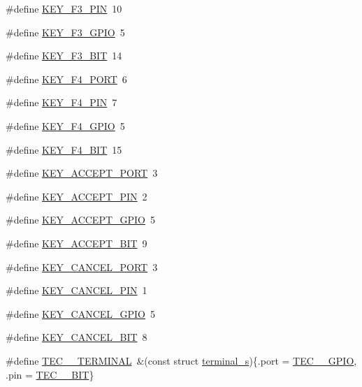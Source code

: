 \begin{DoxyCompactItemize}
\#define \hyperlink{group__hal_ga98312a957dc7b3acccc0fe34a7604e56}{K\+E\+Y\+\_\+\+F3\+\_\+\+P\+IN}~10
\item 
\#define \hyperlink{group__hal_gac7de7a3e791e70cb61e1ba74c23fd8f3}{K\+E\+Y\+\_\+\+F3\+\_\+\+G\+P\+IO}~5
\item 
\#define \hyperlink{group__hal_ga0b750ff71397168903bb9406b4a0bc43}{K\+E\+Y\+\_\+\+F3\+\_\+\+B\+IT}~14
\item 
\#define \hyperlink{group__hal_gaeb2af3258e8481b8855ee6df928fdae4}{K\+E\+Y\+\_\+\+F4\+\_\+\+P\+O\+RT}~6
\item 
\#define \hyperlink{group__hal_ga0b7c8de71cb61c639769e5b3b8ba9603}{K\+E\+Y\+\_\+\+F4\+\_\+\+P\+IN}~7
\item 
\#define \hyperlink{group__hal_gabc1b6065dd7a4f9e7c7eb492f7d3d548}{K\+E\+Y\+\_\+\+F4\+\_\+\+G\+P\+IO}~5
\item 
\#define \hyperlink{group__hal_gadd1233da3fb79555176e60c1433f5d2c}{K\+E\+Y\+\_\+\+F4\+\_\+\+B\+IT}~15
\item 
\#define \hyperlink{group__hal_gac8f017f65635f88ecc35b36bfe9350cb}{K\+E\+Y\+\_\+\+A\+C\+C\+E\+P\+T\+\_\+\+P\+O\+RT}~3
\item 
\#define \hyperlink{group__hal_gaacdece44fd577054dbd03456a76005db}{K\+E\+Y\+\_\+\+A\+C\+C\+E\+P\+T\+\_\+\+P\+IN}~2
\item 
\#define \hyperlink{group__hal_gaec67cfa1c357906d3146de59945a5af1}{K\+E\+Y\+\_\+\+A\+C\+C\+E\+P\+T\+\_\+\+G\+P\+IO}~5
\item 
\#define \hyperlink{group__hal_ga099967afffab053d7b61dc41f1806b8d}{K\+E\+Y\+\_\+\+A\+C\+C\+E\+P\+T\+\_\+\+B\+IT}~9
\item 
\#define \hyperlink{group__hal_ga1bd0a92ccf5d51cbf7510082eff13a95}{K\+E\+Y\+\_\+\+C\+A\+N\+C\+E\+L\+\_\+\+P\+O\+RT}~3
\item 
\#define \hyperlink{group__hal_ga42a5a9380916b6a8f9a1601e4d16e3ce}{K\+E\+Y\+\_\+\+C\+A\+N\+C\+E\+L\+\_\+\+P\+IN}~1
\item 
\#define \hyperlink{group__hal_ga072fd7b6b6eb89b2e4a61425d8b81b09}{K\+E\+Y\+\_\+\+C\+A\+N\+C\+E\+L\+\_\+\+G\+P\+IO}~5
\item 
\#define \hyperlink{group__hal_ga26ec6a583f60654278e37c9d911d791b}{K\+E\+Y\+\_\+\+C\+A\+N\+C\+E\+L\+\_\+\+B\+IT}~8
\item 
\#define \hyperlink{group__hal_gaff1d0922fe20ad714250846eee12de81}{T\+E\+C\+\_\+\_\+\+T\+E\+R\+M\+I\+N\+AL}~\&(const struct \hyperlink{structterminal__s}{terminal\+\_\+s})\{.port = \hyperlink{group__samples_ga8731b2048404c4c819291bebfc6a1e6a}{T\+E\+C\+\_\+\_\+\+G\+P\+IO}, .pin = \hyperlink{group__samples_ga0f27cf5eeffd9d5f04a6a4c57bbdbae7}{T\+E\+C\+\_\+\_\+\+B\+IT}\}

\end{DoxyCompactItemize}
